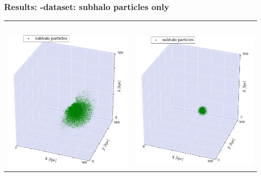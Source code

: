 \begin{frame}
	\frametitle{Results: \dt-dataset: subhalo particles only}
	
	\begin{tabular}{c c}
		\simple\ 	& \neigh \\[1.5em]
		{\includegraphics[width = .49\textwidth]{../report/images/dice-two/dice-two-plot-subhalo-nosaddle.png}}	&
		{\includegraphics[width = .49\textwidth]{../report/images/dice-two/dice-two-plot-subhalo-saddle.png}}  
	\end{tabular}
\end{frame}




%	
%		 
%
%
%
%	



